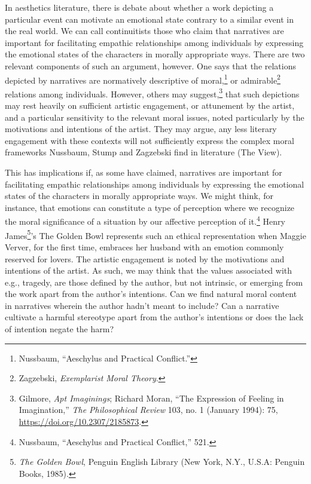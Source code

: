 \documentclass[phdthesis,12pt,final]{wuthesis}
\theoremstyle{definition}
\theoremstyle{definition}
\theoremstyle{definition}
\theoremstyle{definition}
\theoremstyle{remark}
\begin{document}
In aesthetics literature, there is debate about whether a work depicting a particular event can motivate an emotional state contrary to a similar event in the real world. We can call continuitists those who claim that narratives are important for facilitating empathic relationships among individuals by expressing the emotional states of the characters in morally appropriate ways. There are two relevant components of such an argument, however. One says that the relations depicted by narratives are normatively descriptive of moral,\footnote{Nussbaum, {``Aeschylus and Practical Conflict.''}} or admirable\footnote{Zagzebski, \emph{Exemplarist {Moral Theory}}.} relations among individuals. However, others may suggest,\footnote{Gilmore, \emph{Apt {Imaginings}}; Richard Moran, {``The {Expression} of {Feeling} in {Imagination},''} \emph{The Philosophical Review} 103, no. 1 (January 1994): 75, \url{https://doi.org/10.2307/2185873}.} that such depictions may rest heavily on sufficient artistic engagement, or attunement by the artist, and a particular sensitivity to the relevant moral issues, noted particularly by the motivations and intentions of the artist. They may argue, any less literary engagement with these contexts will not sufficiently express the complex moral frameworks Nussbaum, Stump and Zagzebski find in literature (The View).

This has implications if, as some have claimed, narratives are important for facilitating empathic relationships among individuals by expressing the emotional states of the characters in morally appropriate ways. We might think, for instance, that emotions can constitute a type of perception where we recognize the moral significance of a situation by our affective perception of it.\footnote{Nussbaum, {``Aeschylus and Practical Conflict,''} 521.} Henry James\footnote{\emph{The Golden Bowl}, Penguin {English} Library (New York, N.Y., U.S.A: Penguin Books, 1985).}'s The Golden Bowl represents such an ethical representation when Maggie Verver, for the first time, embraces her husband with an emotion commonly reserved for lovers. The artistic engagement is noted by the motivations and intentions of the artist. As such, we may think that the values associated with e.g., tragedy, are those defined by the author, but not intrinsic, or emerging from the work apart from the author's intentions. Can we find natural moral content in narratives wherein the author hadn't meant to include? Can a narrative cultivate a harmful stereotype apart from the author's intentions or does the lack of intention negate the harm?
\end{document}
